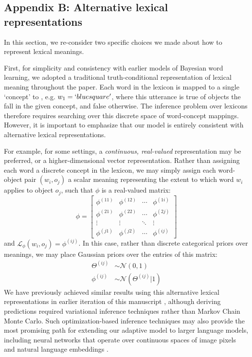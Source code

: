 \documentclass[11pt, floatsintext]{apa6}
\begin{document}
\subsection{Appendix B: Alternative lexical representations}

In this section, we re-consider two specific choices we made about how to represent lexical meanings.

First, for simplicity and consistency with earlier models of Bayesian word learning, we adopted a traditional truth-conditional representation of lexical meaning throughout the paper. 
Each word in the lexicon is mapped to a single `concept' to , e.g. $w_1 = `blue square'$, where this utterance is true of objects the fall in the given concept, and false otherwise. 
The inference problem over lexicons therefore requires searching over this discrete space of word-concept mappings. 
However, it is important to emphasize that our model is entirely consistent with alternative lexical representations.

For example, for some settings, a \emph{continuous, real-valued} representation may be preferred, or a higher-dimensional vector representation.
Rather than assigning each word a discrete concept in the lexicon, we may simply assign each word-object pair $(w_i,o_j)$ a scalar meaning representing the extent to which word $w_i$ applies to object $o_j$, such that $\phi$ is a real-valued matrix:
$$
\phi = \begin{bmatrix}
\phi^{(11)} & \phi^{(12)} & \cdots & \phi^{(1i)} \\
\phi^{(21)} & \phi^{(22)} & \cdots & \phi^{(2j)} \\
\vdots & \vdots &\ddots & \vdots \\
\phi^{(j1)} & \phi^{(j2)} & \cdots & \phi^{(ij)} 
\end{bmatrix}
$$
and $\mathcal{L}_\phi(w_i, o_j) = \phi^{(ij)}$. 
In this case, rather than discrete categorical priors over meanings, we may place Gaussian priors over the entries of this matrix:
\begin{align}
\Theta^{(ij)} & \sim \mathcal{N}(0,1)\nonumber \\
\phi^{(ij)} & \sim \mathcal{N}(\Theta^{(ij)} | 1)\nonumber
\end{align}
We have previously achieved similar results using this alternative lexical representations in earlier iteration of this manuscript \cite{hawkins_convention-formation_2017,hawkins2020generalizing}, although deriving predictions required variational inference techniques rather than Markov Chain Monte Carlo. 
Such optimization-based inference techniques may also provide the most promising path for extending our adaptive model to larger language models, including neural networks that operate over continuous spaces of image pixels and natural language embeddings \cite{hawkins2019continual}.
\end{document}
